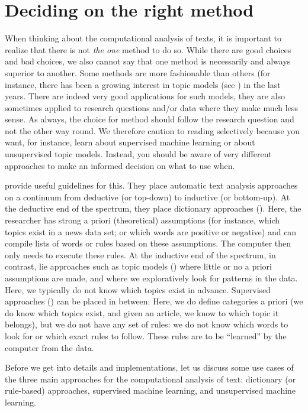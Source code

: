 \section{Deciding on the right method}
\label{sec:deciding}

When thinking about the computational analysis of texts, it is
important to realize that there is not \emph{the one} method to do
so. While there are good choices and bad choices, we also cannot say
that one method is necessarily and always superior to another. Some
methods are more fashionable than others (for instance, there has been
a growing interest in topic models (see ) in the
last years. There are indeed very good applications for such models,
they are also sometimes applied to research questions and/or data
where they make much less sense.  As always, the choice for method
should follow the research question and not the other way round. We
therefore caution to reading  selectively because you
want, for instance, learn about supervised machine learning or about
unsupervised topic models. Instead, you should be aware of very
different approaches to make an informed decision on what to use when.

\cite{Boumans2016} provide useful guidelines for this. They place
automatic text analysis approaches on a continuum from deductive (or
top-down) to inductive (or bottom-up). At the deductive end of the
spectrum, they place dictionary approaches
(). Here, the researcher has strong a priori
(theoretical) assumptions (for instance, which topics exist in a news
data set; or which words are positive or negative) and can compile
lists of words or rules based on these assumptions. The computer then
only needs to execute these rules. At the inductive end of the
spectrum, in contrast, lie approaches such as topic models
() where little or no a priori assumptions are
made, and where we exploratively look for patterns in the data. Here,
we typically do not know which topics exist in advance. Supervised
approaches () can be placed in between: Here, we do
define categories a priori (we do know which topics exist, and given
an article, we know to which topic it belongs), but we do not have
any set of rules: we do not know which words to look for or which
exact rules to follow. These rules are to be ``learned'' by the computer
from the data.

Before we get into details and implementations, let us discuss some
use cases of the three main approaches for the
computational analysis of text: dictionary (or rule-based) approaches,
supervised machine learning, and unsupervised machine learning.


